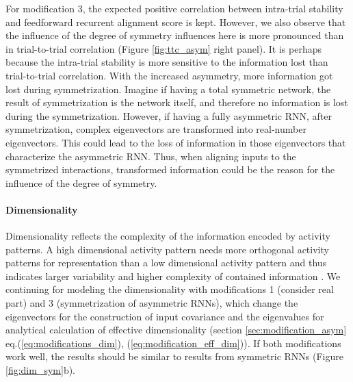 \documentclass[11pt]{article}
\begin{document}
	For modification 3, the expected positive correlation between intra-trial stability and feedforward recurrent alignment score is kept. However, we also observe that the influence of the degree of symmetry influences here is more pronounced than in trial-to-trial correlation (Figure \ref{fig:ttc_asym} right panel). 
	It is perhaps because the intra-trial stability is more sensitive to the information lost than trial-to-trial correlation. With the increased asymmetry, more information got lost during symmetrization. Imagine if having a total symmetric network, the result of symmetrization is the network itself, and therefore no information is lost during the symmetrization. However, if having a fully asymmetric RNN, after symmetrization, complex eigenvectors are transformed into real-number eigenvectors. This could lead to the loss of information in those eigenvectors that characterize the asymmetric RNN.
	Thus, when aligning inputs to the symmetrized interactions, transformed information could be the reason for the influence of the degree of symmetry. 
	
	\paragraph{Dimensionality}
	
	Dimensionality reflects the complexity of the information encoded by activity patterns. A high dimensional activity pattern needs more orthogonal activity patterns for representation than a low dimensional activity pattern and thus indicates larger variability and higher complexity of contained information \cite{tragenap2023nature, bartolo2020dimensionality, badre2021dimensionality}. We continuing for modeling the dimensionality with modifications 1 (consider real part) and 3 (symmetrization of asymmetric RNNs), which change the eigenvectors for the construction of input covariance and the eigenvalues for analytical calculation of effective dimensionality (section \ref{sec:modification_asym} eq.(\ref{eq:modifications_dim}), (\ref{eq:modification_eff_dim})). 
	If both modifications work well, the results should be similar to results from symmetric RNNs (Figure \ref{fig:dim_sym}b). 
	
\end{document}
